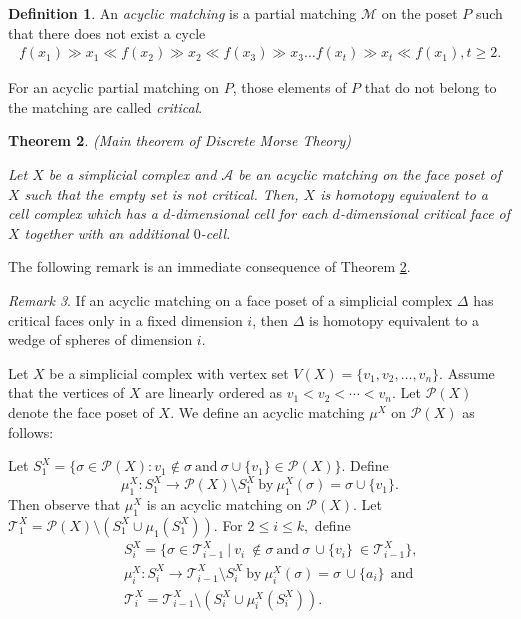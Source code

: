 \documentclass{amsart}
\newtheorem{theorem}{Theorem}[section]
\theoremstyle{definition}
\newtheorem{definition}[theorem]{Definition}
\theoremstyle{remark}
\newtheorem{remark}[theorem]{Remark}
\numberwithin{equation}{section}
\newcommand{\M}{\mathcal{M}}
\newcommand{\cP}{\mathcal{P}}
\newcommand{\T}{\mathcal{T}}
\def\A{{\mathcal{A}}}
\begin{document}
\begin{definition}\label{d1}
	An {\it acyclic matching} is a partial matching  $\M$ on the poset $P$ such that there does not exist a cycle
	\begin{eqnarray*}
		f(x_1)  \gg x_1 \ll f( x_2) \gg x_2  \ll f( x_3) \gg x_3 \dots   f(x_t) \gg x_t  \ll f(x_1), t\geq 2.
	\end{eqnarray*}
\end{definition}
For an acyclic partial matching on $P$, those elements of $P$ that do not belong to the matching are called
{\it critical}.

\begin{theorem}\cite[Theorem 11.13]{Kozlovbook}\label{theorem:Morse_theory} (Main theorem of Discrete Morse Theory)
	
    Let $X$ be a simplicial complex and $\A$ be an acyclic matching on the face poset of $X$ 
	such that the empty set is not critical. 
	Then, $X$ is homotopy equivalent to a cell complex which has a $d$-dimensional cell for each $d$-dimensional
	critical face of $X$ together with an additional $0$-cell.
\end{theorem}

The following remark is an immediate consequence of Theorem \ref{theorem:Morse_theory}.

\begin{remark} \label{remark:wedge of spheres}
	If an acyclic matching on a face poset of a simplicial complex $\Delta$ has critical faces only in a fixed dimension $i$, then $\Delta$ is homotopy equivalent to a wedge of spheres of dimension $i$.
\end{remark}


Let $X$ be a simplicial complex with vertex set $V(X) = \{v_1, v_2, \ldots, v_n\}$. Assume that the vertices of $X$ are linearly ordered as $v_1 < v_2 < \cdots < v_n$.  Let $\mathcal{P}(X)$ denote the face poset of $X$. We define an acyclic matching $\mu^X$ on $\mathcal{P}(X)$ as follows: 


Let $S_1^X = \{\sigma \in \cP(X): v_1 \notin \sigma \ \text{and} \ \sigma \cup \{v_1\} \in \cP(X)\}$. Define $$\mu_1^X : S_1^X \to \cP(X) \setminus S_1^X  \ \text{by} \  \mu_1^X(\sigma) = \sigma \cup \{v_1\}.$$
Then observe that $\mu_1^X$ is an acyclic matching on $\cP(X)$. Let $\T_1^X = \cP(X) \setminus (S_1^X \cup \mu_1(S_1^X))$. 
For  $2 \leq i \leq k ,$ define 
\begin{eqnarray}
	&&S_{i}^X = \{\sigma \in \T_{i-1}^X \ | \ v_i \ \notin \sigma  \ \text{and} \ \sigma \, \cup \{v_i \} \ \in \T_{i-1}^X \}, \label{am:1}\nonumber\\
	&&\mu_{i}^X : S_{i}^X  \rightarrow \T_{i-1}^X \setminus S_{i}^X ~\text{by} ~  \mu_{i}^X(\sigma) = \sigma \, \cup \{a_i\}~~\text{and}\label{am:2} \nonumber\\
	&&\T_i^X= \T_{i-1}^X \setminus (S_i^X \cup \mu_i^X(S_i^X)). \label{am:3} \nonumber
\end{eqnarray}
\end{document}
